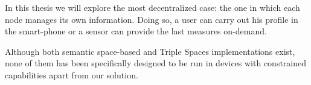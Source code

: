 In this thesis we will explore the most decentralized case: the one in which each node manages its own information.
Doing so, a user can carry out his profile in the smart-phone or a sensor can provide the last measures on-demand.



Although both semantic space-based and Triple Spaces implementations exist, none of them has been specifically designed to be run in devices with constrained capabilities apart from our solution.